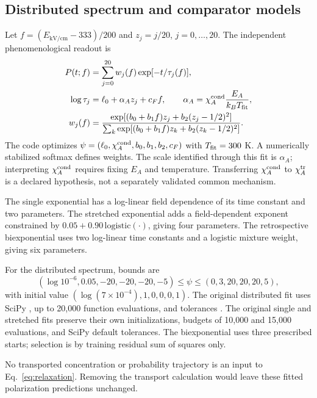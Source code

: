 \documentclass[11pt,a4paper]{article}
\newcommand{\code}[1]{\texttt{\detokenize{#1}}}
\begin{document}
\subsection{Distributed spectrum and comparator models}

Let $f=(E_{\mathrm{kV/cm}}-333)/200$ and $z_j=j/20$, $j=0,\ldots,20$. The independent phenomenological readout is
\begin{align}
 P(t;f)&=\sum_{j=0}^{20}w_j(f)\exp[-t/\tau_j(f)],\\
 \log\tau_j&=\ell_0+\alpha_Az_j+c_Ff,\qquad
 \alpha_A=\chi_A^{\rm cond}\frac{E_A}{k_BT_{\rm fit}},\\
 w_j(f)&=\frac{\exp[(b_0+b_1f)z_j+b_2(z_j-1/2)^2]}
 {\sum_k\exp[(b_0+b_1f)z_k+b_2(z_k-1/2)^2]}.
 \label{eq:relaxation}
\end{align}
The code optimizes $\psi=(\ell_0,\chi_A^{\rm cond},b_0,b_1,b_2,c_F)$ with $T_{\rm fit}=300$ K. A numerically stabilized softmax defines weights. The scale identified through this fit is $\alpha_A$; interpreting $\chi_A^{\rm cond}$ requires fixing $E_A$ and temperature. Transferring $\chi_A^{\rm cond}$ to $\chi_A^{\rm tr}$ is a declared hypothesis, not a separately validated common mechanism.

The single exponential has a log-linear field dependence of its time constant and two parameters. The stretched exponential adds a field-dependent exponent constrained by $0.05+0.90\,\mathrm{logistic}(\cdot)$, giving four parameters. The retrospective biexponential uses two log-linear time constants and a logistic mixture weight, giving six parameters.

For the distributed spectrum, bounds are
\begin{equation}
 (\log10^{-6},0.05,-20,-20,-20,-5)\leq\psi
 \leq(0,3,20,20,20,5),
\end{equation}
with initial value $(\log(7\times10^{-4}),1,0,0,0,1)$. The original distributed fit uses SciPy \code{least_squares}, up to 20,000 function evaluations, and tolerances \code{xtol=ftol=gtol=1e-11}. The original single and stretched fits preserve their own initializations, budgets of 10,000 and 15,000 evaluations, and SciPy default tolerances. The biexponential uses three prescribed starts; selection is by training residual sum of squares only.

No transported concentration or probability trajectory is an input to Eq.~\eqref{eq:relaxation}. Removing the transport calculation would leave these fitted polarization predictions unchanged.
\end{document}
